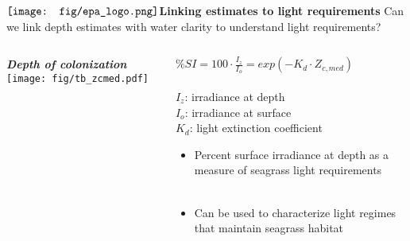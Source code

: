 \documentclass[serif]{beamer}\usepackage[]{graphicx}\usepackage[]{color}
\newcommand{\emtxt}[1]{\textbf{\textit{{\color{mypal4} #1}}}}
\begin{document}
\begin{frame}{$\vcenter{\hbox{\texttt{[image: fig/epa\_logo.png]}}}$\hspace{0.07in}\textbf{Linking estimates to light requirements}}
Can we link depth estimates with water clarity to understand light requirements?
\vspace{-0.2in}
\begin{columns}[t]
\footnotesize
\begin{column}{0.3\textwidth}
\begin{center}
\emtxt{Depth of colonization}
\texttt{[image: fig/tb\_zcmed.pdf]}
\end{center}
\end{column}
\begin{column}{0.64\textwidth}
\vspace{0.2in}
\begin{center}
$\%SI = 100 \cdot \frac{I_{z}}{I_{o}} = exp\left(-K_d \cdot Z_{c,med}\right)$ \\~\\
$I_z$: irradiance at depth \\
$I_o$: irradiance at surface \\
$K_d$: light extinction coefficient 
\end{center}
\begin{itemize}
\item Percent surface irradiance at depth as a measure of seagrass light requirements \\~\\
\item Can be used to characterize light regimes that maintain seagrass habitat
\end{itemize}
\end{column}
\end{columns}
\end{frame}
\end{document}
